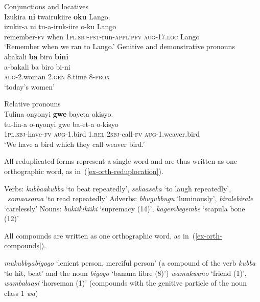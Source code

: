 \newpage
\ea \label{ex-orth-worddivision} 
\begin{xlist}	
\ex Conjunctions and locatives \label{ex-orth-worddivision-conjunctions}\\
	\glll	Izukira \textbf{ni} twairukiire \textbf{oku} Lango.\\
	izukir-a ni tu-a-iruk-iire o-ku Lango\\
	remember-\textsc{fv} 	when  1\textsc{pl.sbj}-\textsc{pst}-run-\textsc{appl}:\textsc{pfv} \textsc{aug}-17.\textsc{loc} Lango\\
	\trans `Remember when we ran to Lango.'
   \ex Genitive and demonstrative pronouns\\
    \glll abakali		\textbf{ba}		biro	\textbf{bini}\\
    a-bakali		ba		biro	bi-ni\\
   \textsc{aug}-2.woman	2.\textsc{gen}		8.time	8-\textsc{prox}\\
    \glt ‘today’s women’

\ex Relative pronouns\\
	\glll Tulina onyonyi \textbf{gwe} bayeta okisyo.\\
 		tu-lin-a o-nyonyi gwe ba-et-a o-kisyo\\
		1\textsc{pl.sbj}-have-\textsc{fv} \textsc{aug}-1.bird 1.\textsc{rel} \textsc{2sbj}-call-\textsc{fv} \textsc{aug}-1.weaver.bird\\
	\trans `We have a bird which they call weaver bird.'
\end{xlist}	
\z

All reduplicated forms represent a single word and are thus written as one orthographic word, as in~(\ref{ex-orth-reduplocation}).

\ea \label{ex-orth-reduplocation}
\begin{xlist}	
	\ex Verbs:  \textit{kubbaakubba} ‘to beat repeatedly’,  \textit{sekaaseka} ‘to laugh repeatedly’, \mbox{ \textit{somaasoma}} ‘to read repeatedly’ 
	\ex Adverbs:  \textit{bbugubbugu} ‘luminously',  \textit{biralebirale} `carelessly'
	\ex Nouns:  \textit{bukiikikiiki} ‘supremacy (14)’,  \textit{kagembegembe} `scapula bone (12)'
\end{xlist}	
\z

All compounds are written as one orthographic word, as in~(\ref{ex-orth-compounds}).

\ea \label{ex-orth-compounds}
\begin{xlist}	
	\ex  \textit{mukubbyabigogo} `lenient person, merciful person' (a compound of the verb  \textit{kubba} `to hit, beat' and the noun  \textit{bigogo} `banana fibre (8)')
	\ex  \textit{wamukwano} ‘friend (1)’,  \textit{wambalaasi} `horseman (1)' (compounds with the genitive particle of the noun class 1  \textit{wa})
\end{xlist}	
\z

